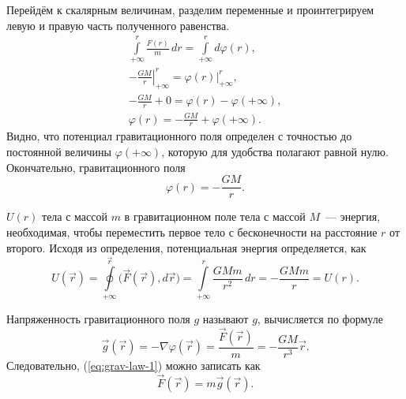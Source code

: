 Перейдём к скалярным величинам, разделим переменные и проинтегрируем левую и правую часть полученного равенства.
\begin{gather*}
	\int\limits_{+\infty}^{r} \frac{ F(r) }{m} \,d r = \int\limits_{+\infty}^{r} d\varphi(r),\\
	-\left.\frac{GM}{r}\right|_{+\infty}^r = \varphi(r)|_{+\infty}^r,\\
	-\frac{GM}{r} + 0 = \varphi(r) - \varphi(+\infty),\\
	\varphi(r) = -\frac{GM}{r} + \varphi(+\infty).
\end{gather*} 
Видно, что потенциал гравитационного поля определен с точностью до постоянной величины $\varphi(+\infty)$, которую для удобства полагают равной нулю. Окончательно,  гравитационного поля
\begin{equation}
	\varphi(r) = -\frac{GM}{r}.
\end{equation}

 $U(r)$ тела с массой $m$ в гравитационном поле тела с массой $M$~--- энергия, необходимая, чтобы переместить первое тело с бесконечности на расстояние $r$ от второго. Исходя из определения, потенциальная энергия определяется, как
\begin{equation}
	U(\vec r)
	= \oint\limits_{+\infty}^\vec{r} \big(\vec F( \vec r),d \vec r\big) 
	= \int\limits_{+\infty}^r \frac{GMm}{r^2} \,d r 
	= -\frac{GMm}{r} = U(r).	
\end{equation}

Напряженность гравитационного поля $g$ называют  $g$, вычисляется по формуле
\begin{equation}
	\vec g(\vec r) = -\nabla \varphi(\vec r) = \frac{\vec F( \vec r)}{m} = - \frac{GM}{r^3} \vec r.
	\label{eq:g}
\end{equation} 
Следовательно, (\ref{eq:grav-law-1}) можно записать как
\begin{equation}
	\vec F (\vec r) = m \vec g(\vec r).
\end{equation}
